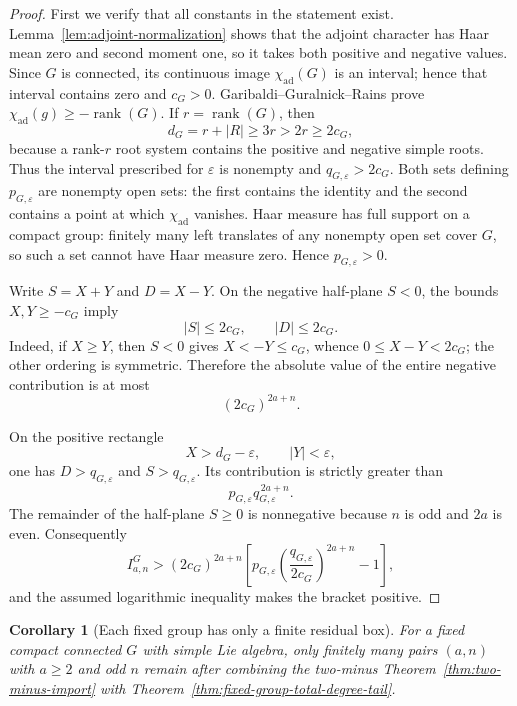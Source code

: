 \documentclass[11pt,reqno]{amsart}
\theoremstyle{plain}
\newtheorem{corollary}[theorem]{Corollary}
\theoremstyle{definition}
\newcommand{\chiad}{\chi_{\mathrm{ad}}}
\begin{document}
\begin{proof}
First we verify that all constants in the statement exist.
Lemma~\ref{lem:adjoint-normalization} shows that the adjoint character has
Haar mean zero and second moment one, so it takes both positive and negative
values.  Since $G$ is connected, its continuous image
$\chiad(G)$ is an interval; hence that interval contains zero and $c_G>0$.
Garibaldi--Guralnick--Rains
\cite[Theorem~2.1]{GaribaldiGuralnickRains2025} prove
$\chiad(g)\geq-\operatorname{rank}(G)$.  If $r=\operatorname{rank}(G)$, then
\[
 d_G=r+|R|\geq3r>2r\geq2c_G,
\]
because a rank-$r$ root system contains the positive and negative simple
roots.  Thus the interval prescribed for $\varepsilon$ is nonempty and
$q_{G,\varepsilon}>2c_G$.  Both sets defining $p_{G,\varepsilon}$ are
nonempty open sets: the first contains the identity and the second contains
a point at which $\chiad$ vanishes.  Haar measure has full support on a
compact group: finitely many left translates of any nonempty open set cover
$G$, so such a set cannot have Haar measure zero.  Hence
$p_{G,\varepsilon}>0$.

Write $S=X+Y$ and $D=X-Y$.  On the negative half-plane $S<0$, the bounds
$X,Y\geq-c_G$ imply
\[
 |S|\leq2c_G,\qquad |D|\leq2c_G.
\]
Indeed, if $X\geq Y$, then $S<0$ gives $X<-Y\leq c_G$, whence
$0\leq X-Y<2c_G$; the other ordering is symmetric.  Therefore the absolute
value of the entire negative contribution is at most
\[
 (2c_G)^{2a+n}.
\]

On the positive rectangle
\[
 X>d_G-\varepsilon,\qquad |Y|<\varepsilon,
\]
one has $D>q_{G,\varepsilon}$ and $S>q_{G,\varepsilon}$.  Its contribution is
strictly greater than
\[
 p_{G,\varepsilon}q_{G,\varepsilon}^{\,2a+n}.
\]
The remainder of the half-plane $S\geq0$ is nonnegative because $n$ is odd
and $2a$ is even.  Consequently
\[
 I^G_{a,n}>
 (2c_G)^{2a+n}
 \left[
 p_{G,\varepsilon}
 \left(\frac{q_{G,\varepsilon}}{2c_G}\right)^{2a+n}-1
 \right],
\]
and the assumed logarithmic inequality makes the bracket positive.
\end{proof}

\begin{corollary}[Each fixed group has only a finite residual box]
\label{cor:fixed-group-finite-residual}
For a fixed compact connected $G$ with simple Lie algebra, only finitely many
pairs $(a,n)$ with $a\geq2$ and odd $n$ remain after combining the
two-minus Theorem~\ref{thm:two-minus-import} with
Theorem~\ref{thm:fixed-group-total-degree-tail}.
\end{corollary}
\end{document}
